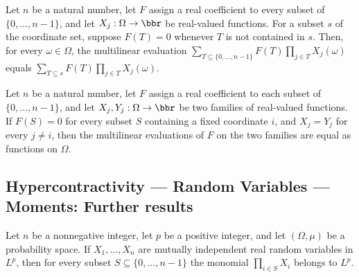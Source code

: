 \begin{theorem}
\leanok
{}
Let $n$ be a natural number, let $F$ assign a real coefficient to every subset of
$\{0,\ldots,n-1\}$, and let $X_j:\Omega\to\bbr$ be real-valued functions. For a subset
$s$ of the coordinate set, suppose $F(T)=0$ whenever $T$ is not contained in $s$. Then,
for every $\omega\in\Omega$, the multilinear evaluation
$\sum_{T\subseteq\{0,\ldots,n-1\}}F(T)\prod_{j\in T}X_j(\omega)$ equals
$\sum_{T\subseteq s}F(T)\prod_{j\in T}X_j(\omega)$.
\end{theorem}

\begin{theorem}
\leanok
{}
Let $n$ be a natural number, let $F$ assign a real coefficient to each subset of
$\{0,\ldots,n-1\}$, and let $X_j,Y_j:\Omega\to\bbr$ be two families of real-valued
functions. If $F(S)=0$ for every subset $S$ containing a fixed coordinate $i$, and
$X_j=Y_j$ for every $j\ne i$, then the multilinear evaluations of $F$ on the two
families are equal as functions on $\Omega$.
\end{theorem}

\subsection*{Hypercontractivity --- Random Variables --- Moments: Further results}

\begin{theorem}
\label{BooleanAnalysis.Hypercontractivity.MultilinearMoments.monomial_memLp_nat}
\leanok
{}
Let $n$ be a nonnegative integer, let $p$ be a positive integer, and let $(\Omega,\mu)$
be a probability space. If $X_1,\ldots,X_n$ are mutually independent real random
variables in $L^p$, then for every subset $S\subseteq\{0,\ldots,n-1\}$ the monomial
$\prod_{i\in S}X_i$ belongs to $L^p$.
\end{theorem}
